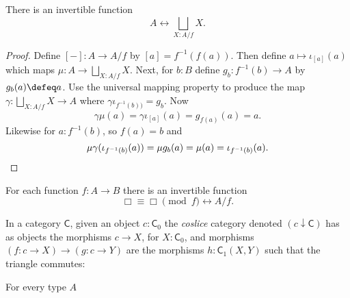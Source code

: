 \begin{theorem}
    There is an invertible function 
    \[
        A\longleftrightarrow \bigsqcup_{X:A/f} X.
    \]
\end{theorem}
\begin{proof}
    Define $[-]:A\to A/f$ by $[a]=f^{-1}(f(a))$.
    Then define $a\mapsto \iota_{[a]}(a)$ which maps 
    $\mu:A\to \bigsqcup_{X:A/f}X$.   Next, for 
    $b:B$ define $g_b:f^{-1}(b)\to A$ by 
    $g_b(a)\defeq a$.  Use the universal mapping property 
    to produce the map $\gamma:\bigsqcup_{X:A/f}X\to A$ 
    where $\gamma\iota_{f^{-1}(b))}=g_b$.
    Now 
    \[ 
        \gamma\mu(a)=\gamma \iota_{[a]}(a)=g_{f(a)}(a)=a.
    \]
    Likewise for $a:f^{-1}(b)$, so $f(a)=b$ and
    \[
        \mu\gamma(\iota_{f^{-1}(b)}(a))=
        \mu g_b(a)
        =\mu(a)
        =\iota_{f^{-1}(b)}(a).
        \qedhere 
    \]
\end{proof}
\begin{theorem}
    For each function $f:A\to B$ there is an invertible function 
    \[
        \Box \equiv \Box\pmod{f}\leftrightarrow A/f.
    \]
\end{theorem}


\begin{definition}
    In a category $\mathsf{C}$, given an object $c:\mathsf{C}_0$
    the \emph{coslice} category denoted $(c\downarrow \mathsf{C})$
    has as objects the morphisms $c\to X$, for $X:\mathsf{C}_0$,
    and morphisms $(f:c\to X)\to (g:c\to Y)$ are the morphisms 
    $h:\mathsf{C}_1(X,Y)$ such that the triangle commutes:
    \begin{center}
    \end{center}
\end{definition}
\begin{theorem}
    For every type $A$
    \begin{center}
\end{center}
\end{theorem}